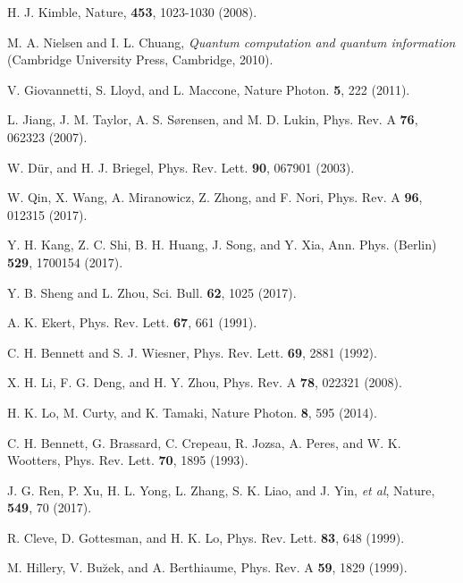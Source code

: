\documentclass[aps,graphicx,twocolumn]{revtex4}%
\begin{document}
\begin{thebibliography}{199}
H. J. Kimble,   Nature, \textbf{453}, 1023-1030 (2008).

M. A. Nielsen and  I. L. Chuang, \emph{Quantum computation and quantum
information} (Cambridge University Press, Cambridge, 2010).

V. Giovannetti, S. Lloyd, and L. Maccone,   Nature Photon. \textbf{5}, 222 (2011). %

L. Jiang, J. M. Taylor, A. S. S{\o}rensen, and  M. D. Lukin,  Phys. Rev.  A \textbf{76}, 062323 (2007).

 W. D\"{u}r, and H. J. Briegel,  Phys. Rev. Lett. \textbf{90}, 067901 (2003).



W. Qin, X. Wang, A. Miranowicz, Z. Zhong, and F.  Nori, Phys. Rev. A \textbf{96}, 012315 (2017).


Y. H. Kang,  Z. C. Shi, B. H. Huang,  J.  Song, and  Y. Xia,  Ann.
Phys. (Berlin) \textbf{529}, 1700154  (2017).



Y. B. Sheng and L.  Zhou,    Sci. Bull. \textbf{62}, 1025 (2017).


A. K. Ekert, Phys. Rev. Lett. \textbf{67}, 661 (1991).

C. H. Bennett  and  S. J. Wiesner, Phys. Rev. Lett. \textbf{69}, 2881 (1992).


X. H. Li,  F. G. Deng,  and H. Y. Zhou, Phys. Rev. A \textbf{78},
022321 (2008).


 H. K. Lo, M. Curty, and K. Tamaki,  Nature Photon. \textbf{8}, 595 (2014).






C. H. Bennett,  G. Brassard, C. Crepeau, R. Jozsa, A. Peres, and  W. K. Wootters,    Phys.  Rev.
Lett. \textbf{70}, 1895 (1993).




J. G. Ren, P. Xu, H. L. Yong, L. Zhang, S. K. Liao, and J. Yin,  \emph{et al},    Nature, \textbf{549}, 70 (2017).


 R. Cleve, D.  Gottesman, and H. K.  Lo,    Phys. Rev. Lett. \textbf{83}, 648 (1999).

M. Hillery, V. Bu\u{z}ek, and  A. Berthiaume,  Phys. Rev. A \textbf{59}, 1829 (1999).


\end{thebibliography}
\end{document}
